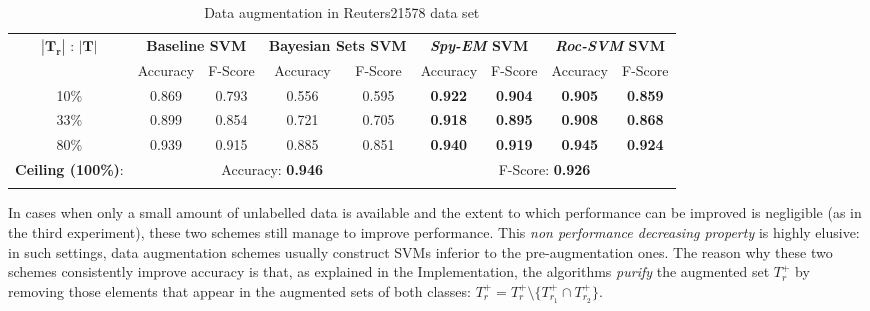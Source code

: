 \documentclass[12pt,twoside,notitlepage,amsart]{report} %
\begin{document}
	\begin{table} 
	\begin{center}
	\caption{Data augmentation in Reuters21578 data set}
	
	\begin{adjustbox}{center}
	
	\renewcommand{\arraystretch}{1.6}
	\begin{tabular}{||c||c c||c c|c c|c c|| }
	
	\hline
	
	\multirow{2}{*}{$|\mathbf{T_r}|$ : $|\mathbf{T}|$ } & \multicolumn{2}{|c||}{\textbf{Baseline SVM}} & \multicolumn{2}{|c|}{\textbf{Bayesian Sets SVM}} & \multicolumn{2}{|c|}{\textbf{\emph{Spy-EM} SVM}} & \multicolumn{2}{|c||}{\textbf{\emph{Roc-SVM} SVM}} \\\cline{2-9}
	
	& Accuracy & F-Score & Accuracy & F-Score & Accuracy & F-Score & Accuracy & F-Score \\
	\hline \hline
	10\% & 0.869 & 0.793  & 0.556 & 0.595 & \textbf{0.922} & \textbf{0.904} & \textbf{0.905} & \textbf{0.859} \\ \hline
	33\% & 0.899 & 0.854  & 0.721 & 0.705 & \textbf{0.918} & \textbf{0.895} & \textbf{0.908} & \textbf{0.868} \\ \hline 
	80\% & 0.939 & 0.915  & 0.885 & 0.851 & \textbf{0.940} & \textbf{0.919} & \textbf{0.945} & \textbf{0.924}  \\ \hline 
	\hline
	\textbf{\small{Ceiling (100\%)}}: & \multicolumn{4}{|c}{ Accuracy: \textbf{0.946} } & \multicolumn{4}{c|}{F-Score: \textbf{0.926}} \\
	}
	\hline  
	
	\end{tabular}
	\end{adjustbox}
	\end{center}
	\end{table}
	

	 
	
In cases when only a small amount of unlabelled data is available and the extent to which performance can be improved is negligible (as in the third experiment), these two schemes still manage to improve performance. This \emph{non performance decreasing property} is highly elusive: in such settings, data augmentation schemes usually construct SVMs inferior to the pre-augmentation ones. The reason why these two schemes consistently improve accuracy is that, as explained in the Implementation, the algorithms \emph{purify} the augmented set $T_r^{+}$ by removing those elements that appear in the augmented sets of both classes: $T_r^{+} = T_r^{+} \setminus \{ T_{r_1}^{+} \cap T_{r_2}^{+} \}$.
\end{document}
